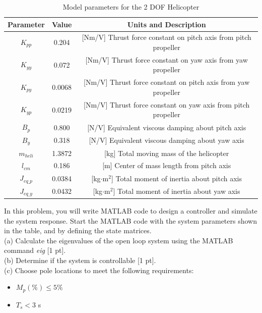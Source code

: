 \documentclass[12pt,letterpaper,onecolumn]{report}
\begin{document}
\begin{table}[ht]
\begin{center}
\caption{Model parameters for the 2 DOF Helicopter}
\begin{tabular}{|c|c|c|}
\hline 
\textbf{Parameter} & \textbf{Value} & \textbf{Units and Description} \\ 
\hline 
$K_{pp}$ & 0.204 & [Nm/V] Thrust force constant on pitch axis from pitch propeller \\ 
\hline 
$K_{yy}$ & 0.072 & [Nm/V] Thrust force constant on yaw axis from yaw propeller \\ 
\hline 
$K_{py}$ & 0.0068 & [Nm/V] Thrust force constant on pitch axis from yaw propeller \\ 
\hline 
$K_{yp}$ & 0.0219 & [Nm/V] Thrust force constant on yaw axis from pitch propeller \\ 
\hline 
$B_p$ & 0.800 & [N/V] Equivalent viscous damping about pitch axis \\ 
\hline 
$B_y$ & 0.318 & [N/V] Equivalent viscous damping about yaw axis \\ 
\hline 
$m_{heli}$ & 1.3872 & [kg] Total moving mass of the helicopter \\ 
\hline 
$l_{cm}$ & 0.186 & [m] Center of mass length from pitch axis \\ 
\hline 
$J_{eq\_p}$ & 0.0384 & [kg$\cdot$m$^2$] Total moment of inertia about pitch axis \\ 
\hline 
$J_{eq\_y}$ & 0.0432 & [kg$\cdot$m$^2$] Total moment of inertia about yaw axis \\ 
\hline 
\end{tabular} 
\end{center}
\end{table}
\newpage
\noindent In this problem, you will write MATLAB code to design a controller and simulate the system response.  Start the MATLAB code with the system parameters shown in the table, and by defining the state matrices.\\
\noindent(a) Calculate the eigenvalues of the open loop system using the MATLAB command \textit{eig} [1 pt].\\
\noindent(b) Determine if the system is controllable [1 pt].\\
\noindent(c) Choose pole locations to meet the following requirements:
\begin{itemize}
\item $M_p(\%)\leq5\%$
\item $T_s<3$ s
\end{itemize}
\end{document}
